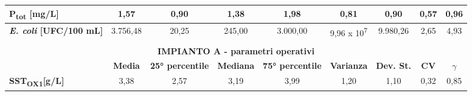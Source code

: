 \begin{sidewaystable}[h]
\begin{center}
\begin{tabular}{lcccccccc}
		\multicolumn{1}{|l|}{\textbf{P\textsubscript{tot} {[}mg/L{]}}}          & \multicolumn{1}{c|}{1,57}           & \multicolumn{1}{c|}{0,90}                    & \multicolumn{1}{c|}{1,38}             & \multicolumn{1}{c|}{1,98}                    & \multicolumn{1}{c|}{0,81}              & \multicolumn{1}{c|}{0,90}              & \multicolumn{1}{c|}{0,57}        & \multicolumn{1}{c|}{0,96}           \\ \hline
		\multicolumn{1}{|l|}{\textbf{\textit{E. coli} {[}UFC/100 mL{]}}} & \multicolumn{1}{c|}{3.756,48}       & \multicolumn{1}{c|}{20,25}                   & \multicolumn{1}{c|}{245,00}           & \multicolumn{1}{c|}{3.000,00}                & \multicolumn{1}{c|}{9,96 x 10\textsuperscript{7}}        & \multicolumn{1}{c|}{9.980,26}          & \multicolumn{1}{c|}{2,65}        & \multicolumn{1}{c|}{4,93}           \\ \hline
		\multicolumn{9}{l}{}                                                                                                                                                                                                                                                                                                                                                                           \\ \hline
		\multicolumn{9}{|c|}{\textbf{IMPIANTO A - parametri operativi}}                                                                                                                                                                                                                                                                                                                                \\ \hline
		\multicolumn{1}{l|}{}                                   & \multicolumn{1}{c|}{\textbf{Media}} & \multicolumn{1}{c|}{\textbf{25° percentile}} & \multicolumn{1}{c|}{\textbf{Mediana}} & \multicolumn{1}{c|}{\textbf{75° percentile}} & \multicolumn{1}{c|}{\textbf{Varianza}} & \multicolumn{1}{c|}{\textbf{Dev. St.}} & \multicolumn{1}{c|}{\textbf{CV}} & \multicolumn{1}{c|}{\textbf{$\gamma$}} \\ \hline
		\multicolumn{1}{|l|}{\textbf{SST\textsubscript{OX1}{[}g/L{]}}}          & \multicolumn{1}{c|}{3,38}           & \multicolumn{1}{c|}{2,57}                    & \multicolumn{1}{c|}{3,19}             & \multicolumn{1}{c|}{3,99}                    & \multicolumn{1}{c|}{1,20}              & \multicolumn{1}{c|}{1,10}              & \multicolumn{1}{c|}{0,32}        & \multicolumn{1}{c|}{0,85}           \\ \hline

\end{tabular}
\end{center}
\end{sidewaystable}
